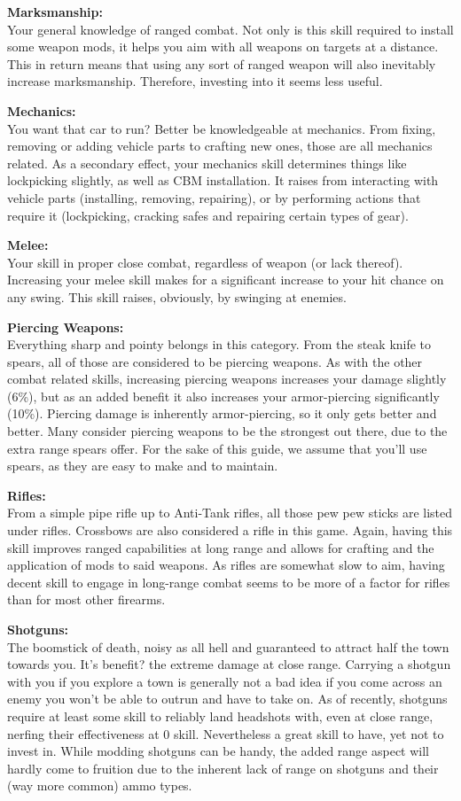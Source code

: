 \textbf{Marksmanship:}\\Your general knowledge of ranged combat. Not only is this skill required to install some weapon mods, it helps you aim with all weapons on targets at a distance. This in return means that using any sort of ranged weapon will also inevitably increase marksmanship. Therefore, investing into it seems less useful.

\textbf{Mechanics:}\\You want that car to run? Better be knowledgeable at mechanics. From fixing, removing or adding vehicle parts to crafting new ones, those are all mechanics related. As a secondary effect, your mechanics skill determines things like lockpicking slightly, as well as CBM installation. It raises from interacting with vehicle parts (installing, removing, repairing), or by performing actions that require it (lockpicking, cracking safes and repairing certain types of gear).

\textbf{Melee:}\\Your skill in proper close combat, regardless of weapon (or lack thereof). Increasing your melee skill makes for a significant increase to your hit chance on any swing. This skill raises, obviously, by swinging at enemies.

\textbf{Piercing Weapons:}\\Everything sharp and pointy belongs in this category. From the steak knife to spears, all of those are considered to be piercing weapons. As with the other combat related skills, increasing piercing weapons increases your damage slightly (6\%), but as an added benefit it also increases your armor-piercing significantly (10\%). Piercing damage is inherently armor-piercing, so it only gets better and better. Many consider piercing weapons to be the strongest out there, due to the extra range spears offer. For the sake of this guide, we assume that you'll use spears, as they are easy to make and to maintain.

\textbf{Rifles:}\\From a simple pipe rifle up to Anti-Tank rifles, all those pew pew sticks are listed under rifles. Crossbows are also considered a rifle in this game. Again, having this skill improves ranged capabilities at long range and allows for crafting and the application of mods to said weapons. As rifles are somewhat slow to aim, having decent skill to engage in long-range combat seems to be more of a factor for rifles than for most other firearms.

\textbf{Shotguns:}\\The boomstick of death, noisy as all hell and guaranteed to attract half the town towards you. It's benefit? the extreme damage at close range. Carrying a shotgun with you if you explore a town is generally not a bad idea if you come across an enemy you won't be able to outrun and have to take on. As of recently, shotguns require at least some skill to reliably land headshots with, even at close range, nerfing their effectiveness at 0 skill. Nevertheless a great skill to have, yet not to invest in. While modding shotguns can be handy, the added range aspect will hardly come to fruition due to the inherent lack of range on shotguns and their (way more common) ammo types.

